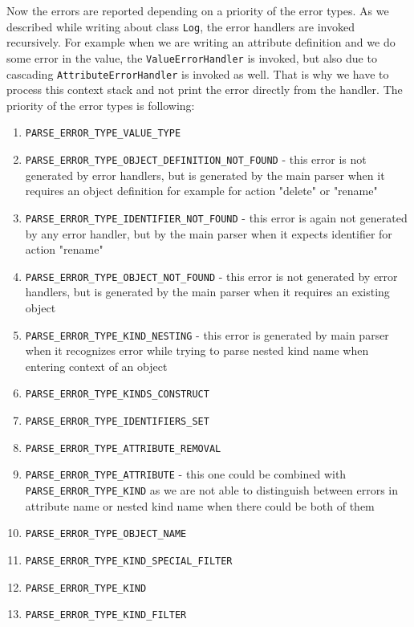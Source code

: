 \documentclass[deska]{subfiles}
\begin{document}
Now the errors are reported depending on a priority of the error types. As we described while writing about class {\tt Log},
the error handlers are invoked recursively. For example when we are writing an attribute definition and we do some error
in the value, the {\tt ValueErrorHandler} is invoked, but also due to cascading {\tt AttributeErrorHandler} is invoked as well.
That is why we have to process this context stack and not print the error directly from the handler.
The priority of the error types is following:

\begin{enumerate}
    \item {\tt PARSE\_ERROR\_TYPE\_VALUE\_TYPE}
    \item {\tt PARSE\_ERROR\_TYPE\_OBJECT\_DEFINITION\_NOT\_FOUND} - this error is not generated by error handlers, but is
                                                               generated by the main parser when it requires an object definition
                                                               for example for action "delete" or "rename"
    \item {\tt PARSE\_ERROR\_TYPE\_IDENTIFIER\_NOT\_FOUND} - this error is again not generated by any error handler, but by the main
                                                        parser when it expects identifier for action "rename"
    \item {\tt PARSE\_ERROR\_TYPE\_OBJECT\_NOT\_FOUND} - this error is not generated by error handlers, but is
                                                    generated by the main parser when it requires an existing object
    \item {\tt PARSE\_ERROR\_TYPE\_KIND\_NESTING} - this error is generated by main parser when it recognizes error while trying
                                                to parse nested kind name when entering context of an object
    \item {\tt PARSE\_ERROR\_TYPE\_KINDS\_CONSTRUCT}
    \item {\tt PARSE\_ERROR\_TYPE\_IDENTIFIERS\_SET}
    \item {\tt PARSE\_ERROR\_TYPE\_ATTRIBUTE\_REMOVAL}
    \item {\tt PARSE\_ERROR\_TYPE\_ATTRIBUTE} - this one could be combined with {\tt PARSE\_ERROR\_TYPE\_KIND} as we are not able
                                             to distinguish between errors in attribute name or nested kind name when
                                             there could be both of them
    \item {\tt PARSE\_ERROR\_TYPE\_OBJECT\_NAME}
    \item {\tt PARSE\_ERROR\_TYPE\_KIND\_SPECIAL\_FILTER}
    \item {\tt PARSE\_ERROR\_TYPE\_KIND}
    \item {\tt PARSE\_ERROR\_TYPE\_KIND\_FILTER}
\end{enumerate}
\end{document}

